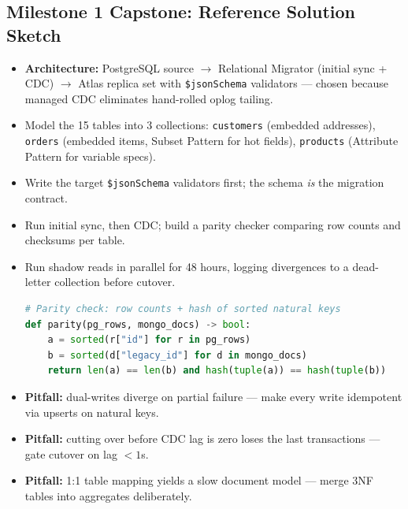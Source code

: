 \documentclass[11pt, a4paper]{article}
\begin{document}
\subsection*{Milestone 1 Capstone: Reference Solution Sketch}
\begin{itemize}[label=-, itemsep=0pt]
    \item \textbf{Architecture:} PostgreSQL source $\to$ Relational Migrator (initial sync + CDC) $\to$ Atlas replica set with \texttt{\$jsonSchema} validators --- chosen because managed CDC eliminates hand-rolled oplog tailing.
    \item Model the 15 tables into 3 collections: \texttt{customers} (embedded addresses), \texttt{orders} (embedded items, Subset Pattern for hot fields), \texttt{products} (Attribute Pattern for variable specs).
    \item Write the target \texttt{\$jsonSchema} validators first; the schema \emph{is} the migration contract.
    \item Run initial sync, then CDC; build a parity checker comparing row counts and checksums per table.
    \item Run shadow reads in parallel for 48 hours, logging divergences to a dead-letter collection before cutover.
\begin{lstlisting}[language=Python]
# Parity check: row counts + hash of sorted natural keys
def parity(pg_rows, mongo_docs) -> bool:
    a = sorted(r["id"] for r in pg_rows)
    b = sorted(d["legacy_id"] for d in mongo_docs)
    return len(a) == len(b) and hash(tuple(a)) == hash(tuple(b))
\end{lstlisting}
    \item \textbf{Pitfall:} dual-writes diverge on partial failure --- make every write idempotent via upserts on natural keys.
    \item \textbf{Pitfall:} cutting over before CDC lag is zero loses the last transactions --- gate cutover on lag $< 1$s.
    \item \textbf{Pitfall:} 1:1 table mapping yields a slow document model --- merge 3NF tables into aggregates deliberately.
\end{itemize}
\end{document}
